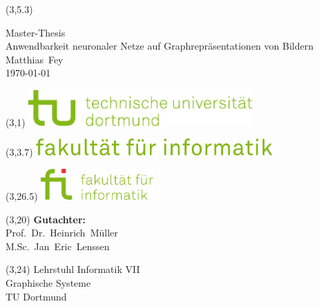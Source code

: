 \begin{titlepage}


\setlength{\TPHorizModule}{1cm}
\setlength{\TPVertModule}{1cm}
\setlength{\parindent}{0cm}

\sffamily

\vspace*{2cm}

\begin{textblock}{9}(3,5.3)
  \Large
  \begin{minipage}[c][9cm]{9cm}
    \begin{center}
      {\Huge Master-Thesis}\\
      \vspace*{1cm}
      {\huge Anwendbarkeit neuronaler Netze auf Graphrepräsentationen von Bildern}\\
      \vspace*{1cm}
      Matthias~Fey\\
      \today
    \end{center}
  \end{minipage}
  \normalsize
\end{textblock}

\begin{textblock}{9}(3,1)
  \includegraphics[height=1.4cm]{images/tud_logo}
\end{textblock}

\begin{textblock}{15}(3,3.7)
  \includegraphics[height=0.65cm]{images/fi_text}
\end{textblock}

\begin{textblock}{9}(3,26.5)
  \includegraphics[height=1.2cm]{images/fi_logo}
\end{textblock}

\begin{textblock}{9}(3,20)
  \Large
  \textbf{Gutachter:}\\
  Prof.~Dr.~Heinrich~Müller\\
  M.Sc.~Jan~Eric~Lenssen
  \normalsize
\end{textblock}

\begin{textblock}{9}(3,24)
  \large
  \textcolor{TUGreen}{
    Lehrstuhl Informatik VII\\
    Graphische Systeme\\
    TU Dortmund
  }
  \normalsize
\end{textblock}

\end{titlepage}
